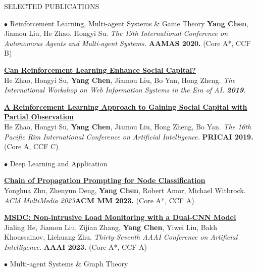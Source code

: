 \documentclass{resume} %
\begin{document}
\begin{rSection}{SELECTED PUBLICATIONS}
\begin{rSubsection}{\large $\bullet$ Reinforcement Learning, Multi-agent Systems \& Game Theory}{}{}{}
		\textbf{Yang Chen}, Jiamou Liu, He Zhao, Hongyi Su. {\em The 19th International Conference on Autonomous Agents and Multi-agent Systems.} \textbf{AAMAS 2020.} (Core A*, CCF B)\\
	\item {\href{https://link.springer.com/chapter/10.1007/978-981-15-3281-8_14}{\bf Can Reinforcement Learning Enhance Social Capital?}}\\
		He Zhao, Hongyi Su, \textbf{Yang Chen}, Jiamou Liu, Bo Yan, Hong Zheng. {\em The International Workshop on Web Information Systems in the Era of AI. {\bf 2019}.}\\
	\item {\href{https://link.springer.com/chapter/10.1007/978-3-030-29908-8_9}{\bf A Reinforcement Learning Approach to Gaining Social Capital with Partial Observation}}\\
		He Zhao, Hongyi Su, \textbf{Yang Chen}, Jiamou Liu, Hong Zheng, Bo Yan. {\em The 16th Pacific Rim International Conference on Artificial Intelligence.} \textbf{PRICAI 2019.} (Core A, CCF C)\\
\end{rSubsection}


\begin{rSubsection}{\large $\bullet$ Deep Learning and Application}{}{}{}
\item{
	\href{}{\bf Chain of Propagation Prompting for Node Classification}}\\
	Yonghua Zhu, Zhenyun Deng, \textbf{Yang Chen}, Robert Amor, Michael Witbrock. {\em ACM MultiMedia 2023}\textbf{ACM MM 2023.} (Core A*, CCF A)\\
\item {
	\href{}{\bf MSDC: Non-intrusive Load Monitoring with a Dual-CNN Model}}\\
		Jialing He, Jiamou Liu, Zijian Zhang, \textbf{Yang Chen}, Yiwei Liu, Bakh Khoussainov, Liehuang Zhu. {\em Thirty-Seventh AAAI Conference on Artificial Intelligence.} \textbf{AAAI 2023.} (Core A*, CCF A)\\
\end{rSubsection}


\begin{rSubsection}{\large $\bullet$ Multi-agent Systems \& Graph Theory}{}{}{}
	

\end{rSubsection}
\end{rSection}
\end{document}
